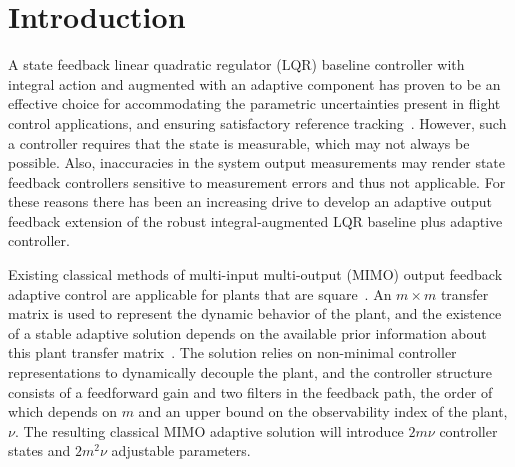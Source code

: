 \documentclass[]{../sty/JGCD}
\theoremstyle{examplestyle}
\begin{document}
  \section{Introduction}\label{sec.intro}

  A state feedback linear quadratic regulator (LQR) baseline controller with integral action and augmented with an adaptive component has proven to be an effective choice for accommodating the parametric uncertainties present in flight control applications, and ensuring satisfactory reference tracking\ \cite{jang.adaptive.2007,gibson.adaptive.2008,matsutani.adaptivegtm.2009,crespo.adaptivegtm.2009,dydek.adaptivex15.2010,wiese.adaptive.2013,lavretskywise.book.2013}.
  However, such a controller requires that the state is measurable, which may not always be possible.
  Also, inaccuracies in the system output measurements may render state feedback controllers sensitive to measurement errors and thus not applicable.
  For these reasons there has been an increasing drive to develop an adaptive output feedback extension of the robust integral-augmented LQR baseline plus adaptive controller.

  Existing classical methods of multi-input multi-output (MIMO) output feedback adaptive control are applicable for plants that are square\ \cite{tao.multivariable.2014}.
  An $m\times m$ transfer matrix is used to represent the dynamic behavior of the plant, and the existence of a stable adaptive solution depends on the available prior information about this plant transfer matrix\ \cite{singh.prior.1984,narendra.stable.2005}.
  The solution relies on non-minimal controller representations to dynamically decouple the plant, and the controller structure consists of a feedforward gain and two filters in the feedback path, the order of which depends on $m$ and an upper bound on the observability index of the plant, $\nu$.
  The resulting classical MIMO adaptive solution will introduce $2m\nu$ controller states and $2m^{2}\nu$ adjustable parameters.
\end{document}
